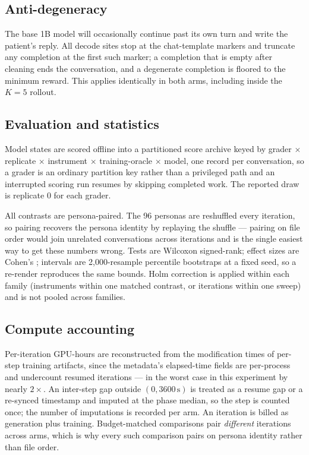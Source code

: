 \subsection{Anti-degeneracy}

The base 1B model will occasionally continue past its own turn and write the patient's reply. All
decode sites stop at the chat-template markers and truncate any completion at the first such
marker; a completion that is empty after cleaning ends the conversation, and a degenerate
completion is floored to the minimum reward. This applies identically in both arms, including
inside the $K{=}5$ rollout.

\subsection{Evaluation and statistics}

Model states are scored offline into a partitioned score archive keyed by
grader $\times$ replicate $\times$ instrument $\times$ training-oracle $\times$ model, one record
per conversation, so a grader is an ordinary partition key rather than a privileged path and an
interrupted scoring run resumes by skipping completed work. The reported draw is replicate 0 for
each grader.

All contrasts are persona-paired. The 96 personas are reshuffled every iteration, so pairing
recovers the persona identity by replaying the shuffle --- pairing on file order would join
unrelated conversations across iterations and is the single easiest way to get these numbers
wrong. Tests are Wilcoxon signed-rank; effect sizes are Cohen's \dz; intervals are 2{,}000-resample
percentile bootstraps at a fixed seed, so a re-render reproduces the same bounds. Holm correction
is applied within each family (instruments within one matched contrast, or iterations within one
sweep) and is not pooled across families.

\subsection{Compute accounting}

Per-iteration GPU-hours are reconstructed from the modification times of per-step training
artifacts, since the metadata's elapsed-time fields are per-process and undercount resumed
iterations --- in the worst case in this experiment by nearly $2\times$. An inter-step gap outside
$(0, 3600\,\mathrm{s})$ is treated as a resume gap or a re-synced timestamp and imputed at the
phase median, so the step is counted once; the number of imputations is recorded per arm. An
iteration is billed as generation plus training. Budget-matched comparisons pair \emph{different}
iterations across arms, which is why every such comparison pairs on persona identity rather than
file order.

